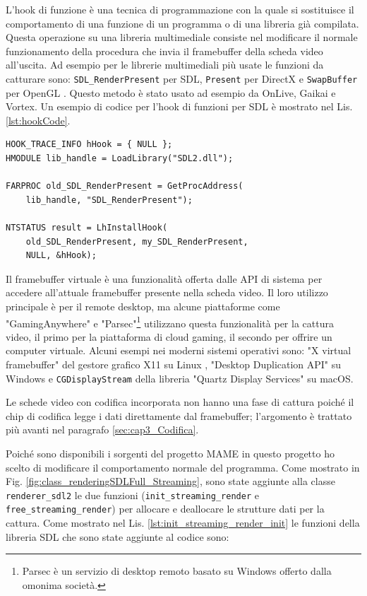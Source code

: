 L'hook di funzione è una tecnica di programmazione con la quale si sostituisce il comportamento di una funzione di un programma o di una libreria già compilata. Questa operazione su una libreria multimediale consiste nel modificare il normale funzionamento della procedura che invia il framebuffer della scheda video all'uscita. Ad esempio per le librerie multimediali più usate le funzioni da catturare sono: \verb|SDL_RenderPresent| per SDL, \verb|Present| per DirectX e \verb|SwapBuffer| per OpenGL \parencite{GamingAnywhere}. Questo metodo è stato usato ad esempio da OnLive, Gaikai e Vortex. Un esempio di codice per l'hook di funzioni per SDL è mostrato nel Lis. \ref{lst:hookCode}.

\begin{lstlisting}[caption=Codice di esempio per hook della libreria SDL, label={lst:hookCode}]
HOOK_TRACE_INFO hHook = { NULL };
HMODULE lib_handle = LoadLibrary("SDL2.dll");

FARPROC old_SDL_RenderPresent =	GetProcAddress(
	lib_handle, "SDL_RenderPresent");

NTSTATUS result = LhInstallHook(
	old_SDL_RenderPresent, my_SDL_RenderPresent,
	NULL, &hHook);
\end{lstlisting}

Il framebuffer virtuale è una funzionalità offerta dalle API di sistema per accedere all'attuale framebuffer presente nella scheda video. Il loro utilizzo principale è per il remote desktop, ma alcune piattaforme come "GamingAnywhere" \parencite{GamingAnywhere} e "Parsec"\footnote{Parsec è un servizio di desktop remoto basato su Windows offerto dalla omonima società.} \parencite{TheTechnologyBehindALowLatencyCloudGamingService} utilizzano questa funzionalità per la cattura video, il primo per la piattaforma di cloud gaming, il secondo per offrire un computer virtuale. Alcuni esempi nei moderni sistemi operativi sono: "X virtual framebuffer" del gestore grafico X11 su Linux \parencite{XVFB}, "Desktop Duplication API" su Windows \parencite{DesktopDuplicationAPI} e \verb|CGDisplayStream| della libreria "Quartz Display Services" su macOS.

Le schede video con codifica incorporata non hanno una fase di cattura poiché il chip di codifica legge i dati direttamente dal framebuffer; l'argomento è trattato più avanti nel paragrafo \ref{sec:cap3_Codifica}.

Poiché sono disponibili i sorgenti del progetto MAME in questo progetto ho scelto di modificare il comportamento normale del programma. Come mostrato in Fig. \ref{fig:class_renderingSDLFull_Streaming}, sono state aggiunte alla classe \verb|renderer_sdl2| le due funzioni (\verb|init_streaming_render| e \verb|free_streaming_render|) per allocare e deallocare le strutture dati per la cattura. Come mostrato nel Lis. \ref{lst:init_streaming_render_init} le funzioni della libreria SDL che sono state aggiunte al codice sono:

